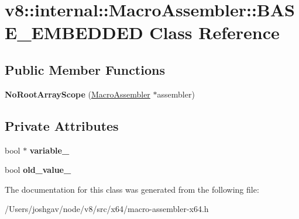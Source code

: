 \hypertarget{classv8_1_1internal_1_1_macro_assembler_1_1_b_a_s_e___e_m_b_e_d_d_e_d}{}\section{v8\+:\+:internal\+:\+:Macro\+Assembler\+:\+:B\+A\+S\+E\+\_\+\+E\+M\+B\+E\+D\+D\+ED Class Reference}
\label{classv8_1_1internal_1_1_macro_assembler_1_1_b_a_s_e___e_m_b_e_d_d_e_d}
\subsection*{Public Member Functions}
\begin{DoxyCompactItemize}
\item 
{\bfseries No\+Root\+Array\+Scope} (\hyperlink{classv8_1_1internal_1_1_macro_assembler}{Macro\+Assembler} $\ast$assembler)\hypertarget{classv8_1_1internal_1_1_macro_assembler_1_1_b_a_s_e___e_m_b_e_d_d_e_d_a6d9a1e4d75ba4f74dd73b8379a310197}{}\label{classv8_1_1internal_1_1_macro_assembler_1_1_b_a_s_e___e_m_b_e_d_d_e_d_a6d9a1e4d75ba4f74dd73b8379a310197}

\end{DoxyCompactItemize}
\subsection*{Private Attributes}
\begin{DoxyCompactItemize}
\item 
bool $\ast$ {\bfseries variable\+\_\+}\hypertarget{classv8_1_1internal_1_1_macro_assembler_1_1_b_a_s_e___e_m_b_e_d_d_e_d_ab2f911486ad0d49ab7c3dbbce148e85e}{}\label{classv8_1_1internal_1_1_macro_assembler_1_1_b_a_s_e___e_m_b_e_d_d_e_d_ab2f911486ad0d49ab7c3dbbce148e85e}

\item 
bool {\bfseries old\+\_\+value\+\_\+}\hypertarget{classv8_1_1internal_1_1_macro_assembler_1_1_b_a_s_e___e_m_b_e_d_d_e_d_a3477ccd79f9faf9ddfa3e76886ecded0}{}\label{classv8_1_1internal_1_1_macro_assembler_1_1_b_a_s_e___e_m_b_e_d_d_e_d_a3477ccd79f9faf9ddfa3e76886ecded0}

\end{DoxyCompactItemize}


The documentation for this class was generated from the following file\+:\begin{DoxyCompactItemize}
\item 
/\+Users/joshgav/node/v8/src/x64/macro-\/assembler-\/x64.\+h\end{DoxyCompactItemize}
